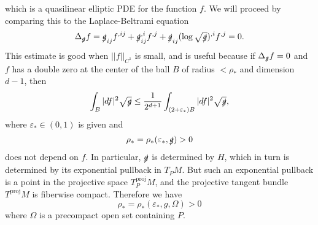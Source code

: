 \documentclass[reqno,12pt,letterpaper]{amsart}
\theoremstyle{definition}
\numberwithin{equation}{section}
\begin{document}
which is a quasilinear elliptic PDE for the function $f$.
We will proceed by comparing this to the Laplace-Beltrami equation
$$\Delta_{\slashed g} f = \slashed g_{ij} f^{,ij} + \slashed g_{ij}^{,i} f^{,j} + \slashed g_{ij} (\log \sqrt{\slashed g})^{,i} f^{,j} = 0.$$
This estimate is good when $||f||_{C^1}$ is small, and is useful because if $\Delta_{\slashed g} f = 0$ and $f$ has a double zero at the center of the ball $B$ of radius $ < \rho_*$ and dimension $d - 1$, then
$$\int_B |df|^2 \sqrt{\slashed g} \leq \frac{1}{2^{d + 1}} \int_{(2 + \varepsilon_*)B} |df|^2 \sqrt{\slashed g},$$
where $\varepsilon_* \in (0, 1)$ is given and
$$\rho_* = \rho_*(\varepsilon_*, \slashed g) > 0$$
does not depend on $f$.
In particular, $\slashed g$ is determined by $H$, which in turn is determined by its exponential pullback in $T_PM$.
But such an exponential pullback is a point in the projective space $T_P^\mathrm{proj} M$, and the projective tangent bundle $T^\mathrm{proj} M$ is fiberwise compact.
Therefore we have
$$\rho_* = \rho_*(\varepsilon_*, g, \Omega) > 0$$
where $\Omega$ is a precompact open set containing $P$.

\printbibliography
\end{document}
